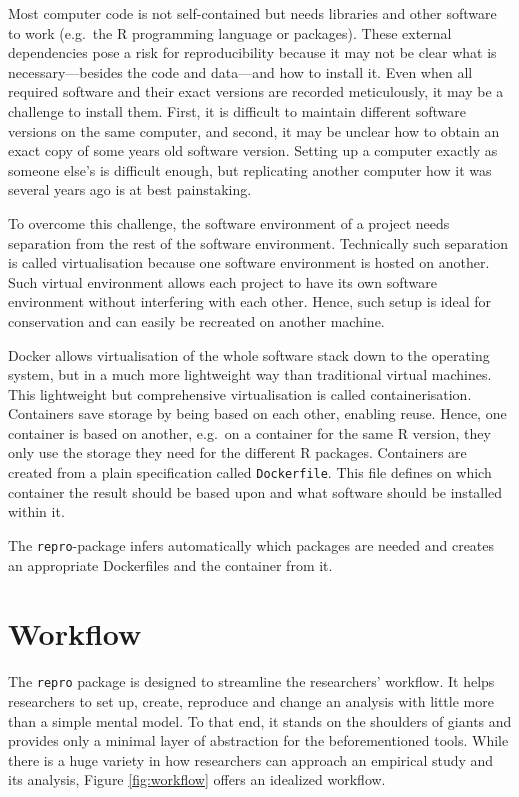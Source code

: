 \documentclass[12pt,a4paper,twoside]{article}
\begin{document}
Most computer code is not self-contained but needs libraries and other software to work (e.g.~the R programming language or packages).
These external dependencies pose a risk for reproducibility because it may not be clear what is necessary---besides the code and data---and how to install it.
Even when all required software and their exact versions are recorded meticulously, it may be a challenge to install them.
First, it is difficult to maintain different software versions on the same computer, and second, it may be unclear how to obtain an exact copy of some years old software version.
Setting up a computer exactly as someone else's is difficult enough, but replicating another computer how it was several years ago is at best painstaking.

To overcome this challenge, the software environment of a project needs separation from the rest of the software environment. Technically such separation is called virtualisation because one software environment is hosted on another. Such virtual environment allows each project to have its own software environment without interfering with each other. Hence, such setup is ideal for conservation and can easily be recreated on another machine.

Docker allows virtualisation of the whole software stack down to the operating system, but in a much more lightweight way than traditional virtual machines. This lightweight but comprehensive virtualisation is called containerisation. Containers save storage by being based on each other, enabling reuse. Hence, one container is based on another, e.g.~on a container for the same R version, they only use the storage they need for the different R packages. Containers are created from a plain specification called \texttt{Dockerfile}. This file defines on which container the result should be based upon and what software should be installed within it.

The \texttt{repro}-package infers automatically which packages are needed and creates an appropriate Dockerfiles and the container from it.

\hypertarget{workflow}{%
\section{Workflow}\label{workflow}}

The \texttt{repro} package is designed to streamline the researchers' workflow.
It helps researchers to set up, create, reproduce and change an analysis with little more than a simple mental model.
To that end, it stands on the shoulders of giants and provides only a minimal layer of abstraction for the beforementioned tools.
While there is a huge variety in how researchers can approach an empirical study and its analysis, Figure \ref{fig:workflow} offers an idealized workflow.
\end{document}

